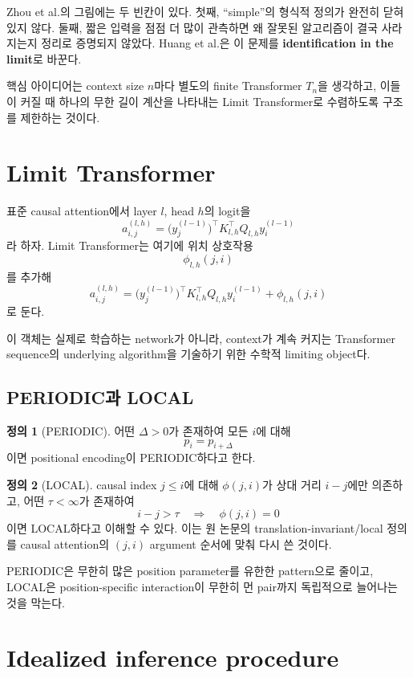 \documentclass[11pt,a4paper,oneside,openany]{memoir}
\theoremstyle{definition}
\newtheorem{definition}{정의}[chapter]
\begin{document}
Zhou et al.의 그림에는 두 빈칸이 있다.
첫째, ``simple''의 형식적 정의가 완전히 닫혀 있지 않다.
둘째, 짧은 입력을 점점 더 많이 관측하면 왜 잘못된 알고리즘이 결국 사라지는지 정리로 증명되지 않았다.
Huang et al.은 이 문제를 \textbf{identification in the limit}로 바꾼다.

핵심 아이디어는 context size $n$마다 별도의 finite Transformer $T_n$을 생각하고,
이들이 커질 때 하나의 무한 길이 계산을 나타내는 Limit Transformer로 수렴하도록 구조를 제한하는 것이다.

\section{Limit Transformer}

표준 causal attention에서 layer $l$, head $h$의 logit을
\[
a^{(l,h)}_{i,j}
=\bigl(y_j^{(l-1)}\bigr)^\top
K_{l,h}^\top Q_{l,h}y_i^{(l-1)}
\]
라 하자. Limit Transformer는 여기에 위치 상호작용
\[
\phi_{l,h}(j,i)
\]
를 추가해
\[
a^{(l,h)}_{i,j}
=\bigl(y_j^{(l-1)}\bigr)^\top
K_{l,h}^\top Q_{l,h}y_i^{(l-1)}
+\phi_{l,h}(j,i)
\]
로 둔다.

이 객체는 실제로 학습하는 network가 아니라, context가 계속 커지는 Transformer sequence의 underlying algorithm을 기술하기 위한 수학적 limiting object다.

\subsection{PERIODIC과 LOCAL}

\begin{definition}[PERIODIC]
어떤 $\Delta>0$가 존재하여 모든 $i$에 대해
\[
p_i=p_{i+\Delta}
\]
이면 positional encoding이 PERIODIC하다고 한다.
\end{definition}

\begin{definition}[LOCAL]
causal index $j\le i$에 대해 $\phi(j,i)$가 상대 거리 $i-j$에만 의존하고,
어떤 $\tau<\infty$가 존재하여
\[
i-j>\tau\quad\Longrightarrow\quad \phi(j,i)=0
\]
이면 LOCAL하다고 이해할 수 있다.
이는 원 논문의 translation-invariant/local 정의를 causal attention의 $(j,i)$ argument 순서에 맞춰 다시 쓴 것이다.
\end{definition}

PERIODIC은 무한히 많은 position parameter를 유한한 pattern으로 줄이고,
LOCAL은 position-specific interaction이 무한히 먼 pair까지 독립적으로 늘어나는 것을 막는다.

\section{Idealized inference procedure}
\end{document}
